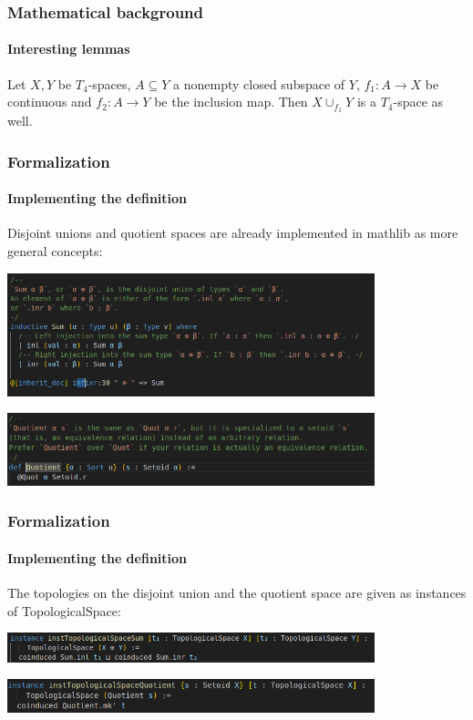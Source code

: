 \documentclass{beamer}
\begin{document}
	\begin{frame}
		\frametitle{Mathematical background}
		\framesubtitle{Interesting lemmas}
		\begin{lemma}
			Let $X, Y$ be $T_4$-spaces, $A \subseteq Y$ a nonempty closed subspace of $Y$, $f_1 : A \to X$ be continuous and $f_2 : A \to Y$ be the inclusion map. Then $X \cup_{f_1} Y$ is a $T_4$-space as well.
		\end{lemma}
	\end{frame}
	\begin{frame}
		\frametitle{Formalization}
		\framesubtitle{Implementing the definition}
		Disjoint unions and quotient spaces are already implemented in mathlib as more general concepts:
		
		\includegraphics[width = 0.8\textwidth]{Disjoint_union.png}
		
		\includegraphics[width = 0.8\textwidth]{Quotient.png}
	\end{frame}
	\begin{frame}
		\frametitle{Formalization}
		\framesubtitle{Implementing the definition}
		The topologies on the disjoint union and the quotient space are given as instances of TopologicalSpace:
		
		\includegraphics[width = 0.8\textwidth]{Disjoint_union_topology.png}
		
		\includegraphics[width = 0.8\textwidth]{Quotienttopology.png}
	\end{frame}
\end{document}
